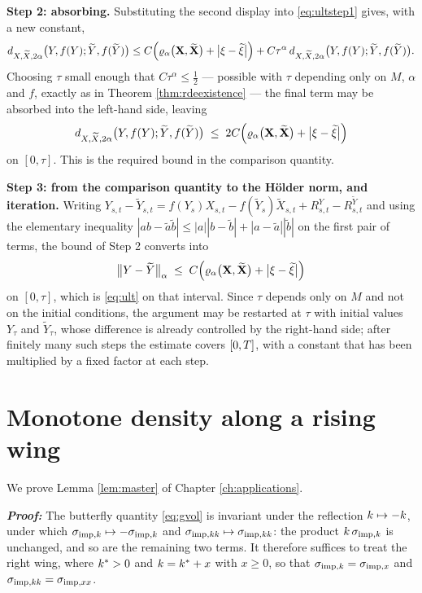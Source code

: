 \medskip
\noindent\textbf{Step 2: absorbing.} Substituting the second display into \eqref{eq:ultstep1} gives,
with a new constant,
\[
d_{X,\widetilde X,2\alpha}\bigl(Y,f(Y);\widetilde Y,f(\widetilde Y)\bigr)
\leq C\Bigl(\varrho_{\alpha}\bigl(\mathbf{X},\widetilde{\mathbf{X}}\bigr)+\bigl|\xi-\widetilde\xi\bigr|\Bigr)
+ C\tau^{\alpha}\,d_{X,\widetilde X,2\alpha}\bigl(Y,f(Y);\widetilde Y,f(\widetilde Y)\bigr).
\]
Choosing $\tau$ small enough that $C\tau^{\alpha}\leq\tfrac12$ --- possible with $\tau$ depending
only on $M$, $\alpha$ and $f$, exactly as in Theorem \ref{thm:rdeexistence} --- the final term may be
absorbed into the left-hand side, leaving
\[
d_{X,\widetilde X,2\alpha}\bigl(Y,f(Y);\widetilde Y,f(\widetilde Y)\bigr)
\;\leq\; 2C\Bigl(\varrho_{\alpha}\bigl(\mathbf{X},\widetilde{\mathbf{X}}\bigr)+\bigl|\xi-\widetilde\xi\bigr|\Bigr)
\]
on $[0,\tau]$. This is the required bound in the comparison quantity.

\medskip
\noindent\textbf{Step 3: from the comparison quantity to the Hölder norm, and iteration.} Writing
$Y_{s,t}-\widetilde Y_{s,t} = f(Y_s)X_{s,t} - f(\widetilde Y_s)\widetilde X_{s,t} + R^{Y}_{s,t}-R^{\widetilde Y}_{s,t}$
and using the elementary inequality $|ab-\tilde a\tilde b|\leq|a||b-\tilde b|+|a-\tilde a||\tilde b|$
on the first pair of terms, the bound of Step 2 converts into
\[
\bigl\lVert Y-\widetilde Y\bigr\rVert_{\alpha} \;\leq\; C\Bigl(\varrho_{\alpha}\bigl(\mathbf{X},\widetilde{\mathbf{X}}\bigr)+\bigl|\xi-\widetilde\xi\bigr|\Bigr)
\]
on $[0,\tau]$, which is \eqref{eq:ult} on that interval. Since $\tau$ depends only on $M$ and not on
the initial conditions, the argument may be restarted at $\tau$ with initial values $Y_\tau$ and
$\widetilde Y_\tau$, whose difference is already controlled by the right-hand side; after finitely
many such steps the estimate covers $[0,T]$, with a constant that has been multiplied by a fixed
factor at each step. \qedfilledtext

\section{Monotone density along a rising wing}\label{app:proof:master}
We prove Lemma \ref{lem:master} of Chapter \ref{ch:applications}.

\textbf{\textit{Proof:}} The butterfly quantity \eqref{eq:gvol} is invariant under the reflection
$k\mapsto-k$, under which $\sigma_{\mathrm{imp},k}\mapsto-\sigma_{\mathrm{imp},k}$ and $\sigma_{\mathrm{imp},kk}\mapsto\sigma_{\mathrm{imp},kk}$: the product
$k\,\sigma_{\mathrm{imp},k}$ is unchanged, and so are the remaining two terms. It therefore suffices to treat the
right wing, where $k^{*}>0$ and $k=k^{*}+x$ with $x\ge0$, so that $\sigma_{\mathrm{imp},k}=\sigma_{\mathrm{imp},x}$ and
$\sigma_{\mathrm{imp},kk}=\sigma_{\mathrm{imp},xx}$.


